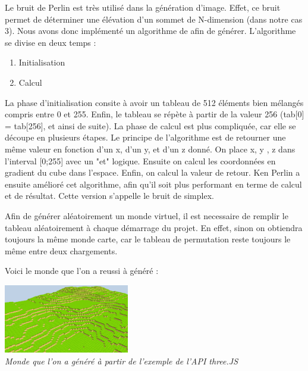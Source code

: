﻿Le bruit de Perlin est très utilisé dans la génération d'image. Effet, ce bruit permet de déterminer une élévation d'un sommet de N-dimension (dans notre cas 3). Nous avons donc implémenté un algorithme de afin de générer. L'algorithme se divise en deux temps :

\begin{enumerate}
	\item Initialisation
	\item Calcul
\end{enumerate}

La phase d'initialisation consite à avoir un tableau de 512 éléments bien mélangés compris entre 0 et 255. Enfin, le tableau se répète à partir de la valeur 256 (tab[0] = tab[256], et ainsi de suite). La phase de calcul est plus compliquée, car elle se découpe en plusieurs étapes. Le principe de l'algorithme est de retourner une même valeur en fonction d'un x, d'un y, et d'un z donné. On place x, y , z dans l'interval [0;255] avec un "et" logique. Ensuite on calcul les coordonnées en gradient du cube dans l'espace. Enfin, on calcul la valeur de retour. Ken Perlin a ensuite amélioré cet algorithme, afin qu'il soit plus performant en terme de calcul et de résultat. Cette version s'appelle le bruit de simplex.

Afin de générer aléatoirement un monde virtuel, il est necessaire de remplir le tableau aléatoirement à chaque démarrage du projet. En effet, sinon on obtiendra toujours la même monde carte, car le tableau de permutation reste toujours le même entre deux chargements.

Voici le monde que l'on a reussi à généré :

\begin{center}
	\null\vspace{0.25cm}
	\includegraphics[height=3cm]{images/OurMinecraftWorld.png}\\
	\textit{Monde que l'on a généré à partir de l'exemple de l'API three.JS}\\
\end{center}